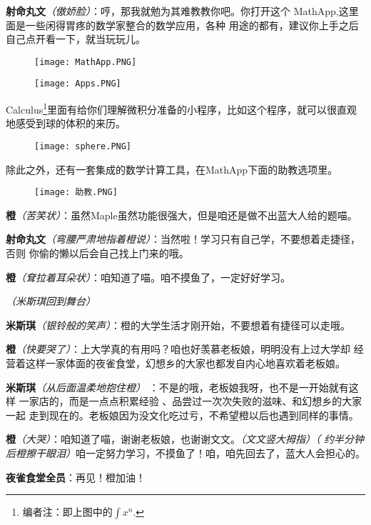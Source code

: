 \textbf{射命丸文}\textit{（傲娇脸）}：哼，那我就勉为其难教教你吧。你打开这个
MathApp,这里面是一些闲得胃疼的数学家整合的数学应用，各种
用途的都有，建议你上手之后自己点开看一下，就当玩玩儿。

\begin{figure}[h]
    \centering
    \texttt{[image: MathApp.PNG]}
\end{figure}
\begin{figure}[h]
    \centering
    \texttt{[image: Apps.PNG]}
\end{figure}

Calculus\footnote{编者注：即上图中的$\int
        x^n$.}里面有给你们理解微积分准备的小程序，比如这个程序，就可以很直观地感受到球的体积的来历。

\begin{figure}[htpb]
    \centering
    \texttt{[image: sphere.PNG]}
\end{figure}

除此之外，还有一套集成的数学计算工具，在MathApp下面的助教选项里。
\begin{figure}[htpb]
    \centering
    \texttt{[image: 助教.PNG]}
\end{figure}

\textbf{橙}\textit{（苦笑状）}：虽然Maple虽然功能很强大，但是咱还是做不出蓝大人给的题喵。

\textbf{射命丸文}\textit{（弯腰严肃地指着橙说）}：当然啦！学习只有自己学，不要想着走捷径，否则
你偷的懒以后会自己找上门来的哦。

\textbf{橙}\textit{（耷拉着耳朵状）}：咱知道了喵。咱不摸鱼了，一定好好学习。

\textit{（米斯琪回到舞台）}

\textbf{米斯琪}\textit{（银铃般的笑声）}：橙的大学生活才刚开始，不要想着有捷径可以走哦。

\textbf{橙}\textit{（快要哭了）}：上大学真的有用吗？咱也好羡慕老板娘，明明没有上过大学却
经营着这样一家体面的夜雀食堂，幻想乡的大家也都发自内心地喜欢着老板娘。

\textbf{米斯琪}\textit{（从后面温柔地抱住橙）}
：不是的哦，老板娘我呀，也不是一开始就有这样
一家店的，而是一点点积累经验
、品尝过一次次失败的滋味、和幻想乡的大家一起
走到现在的。老板娘因为没文化吃过亏，不希望橙以后也遇到同样的事情。

\textbf{橙}\textit{（大哭）}：咱知道了喵，谢谢老板娘，也谢谢文文。\textit{（文文竖大拇指）（
    约半分钟后橙擦干眼泪）}咱一定努力学习，不摸鱼了！咱，咱先回去了，蓝大人会担心的。

\textbf{夜雀食堂全员}：再见！橙加油！

